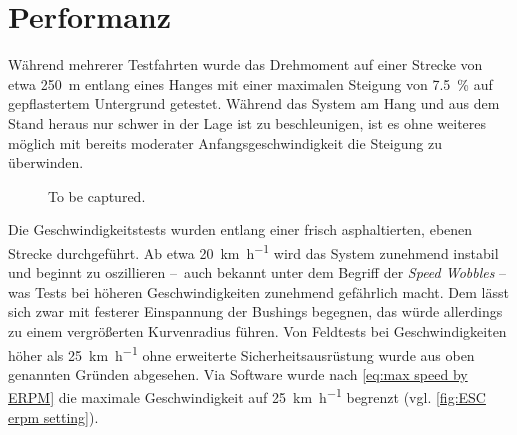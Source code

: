 	\section{Performanz}
		Während mehrerer Testfahrten wurde das Drehmoment auf einer Strecke von etwa \qty{250}{\metre} entlang eines Hanges mit einer maximalen Steigung von \qty{7,5}{\percent} auf gepflastertem Untergrund getestet.
		Während das System am Hang und aus dem Stand heraus nur schwer in der Lage ist zu beschleunigen, ist es ohne weiteres möglich mit bereits moderater Anfangsgeschwindigkeit die Steigung zu überwinden.
		\begin{figure}[h]
			\centering
			
			\caption[]{To be captured.}%
			\label{fig:esc testdrive plot}
		\end{figure}
		Die Geschwindigkeitstests wurden entlang einer frisch asphaltierten, ebenen Strecke durchgeführt.
		Ab etwa \qty{20}{\kilo\metre\per\hour} wird das System zunehmend instabil und beginnt zu oszillieren --~auch bekannt unter dem Begriff der \textit{Speed Wobbles} -- was Tests bei höheren Geschwindigkeiten zunehmend gefährlich macht.
		Dem lässt sich zwar mit festerer Einspannung der Bushings begegnen, das würde allerdings zu einem vergrößerten Kurvenradius führen.
		Von Feldtests bei Geschwindigkeiten höher als \qty{25}{\kilo\metre\per\hour} ohne erweiterte Sicherheitsausrüstung wurde aus oben genannten Gründen abgesehen.
		Via Software wurde nach \cref{eq:max speed by ERPM} die maximale Geschwindigkeit auf \qty{25}{\kilo\metre\per\hour} begrenzt (vgl. \cref{fig:ESC erpm setting}).

